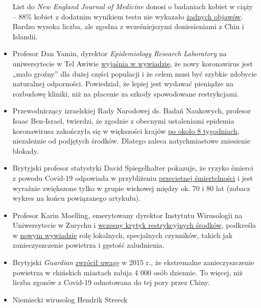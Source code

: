 \begin{itemize}
  List do \emph{New England Journal of Medicine} donosi o badaniach
  kobiet w ciąży -- 88\% kobiet z dodatnim wynikiem testu nie wykazało
  \href{https://www.nejm.org/doi/full/10.1056/NEJMc2009316}{żadnych
  objawów}. Bardzo wysoka liczba, ale zgodna z wcześniejszymi
  doniesieniami z Chin i Islandii.
\item
  Profesor Dan Yamin, dyrektor \emph{Epidemiology Research Laboratory}
  na uniwersytecie w Tel Awiwie
  \href{https://www.ynet.co.il/articles/0,7340,L-5714371,00.html}{wyjaśnia
  w wywiadzie}, że nowy koronawirus jest „mało groźny'' dla dużej części
  populacji i że celem musi być szybkie zdobycie naturalnej odporności.
  Powiedział, że lepiej jest wydawać pieniądze na rozbudowę kliniki, niż
  na płacenie za szkody spowodowane restrykcjami.
\item
  Przewodniczący izraelskiej Rady Narodowej ds. Badań Naukowych,
  profesor Isaac Ben-Israel, twierdzi, że zgodnie z obecnymi ustaleniami
  epidemia koronawirusa zakończyła się w większości krajów
  \href{https://www.timesofisrael.com/top-israeli-prof-claims-simple-stats-show-virus-plays-itself-out-after-70-days/}{po
  około 8 tygodniach}, niezależnie od podjętych środków. Dlatego zaleca
  natychmiastowe zniesienie blokady.
\item
  Brytyjski profesor statystyki David Spiegelhalter pokazuje, że ryzyko
  śmierci z powodu Covid-19 odpowiada w przybliżeniu
  \href{https://medium.com/wintoncentre/how-much-normal-risk-does-covid-represent-4539118e1196}{przecietnej
  śmiertelności} i jest wyraźnie zwiększone tylko w grupie wiekowej
  między ok. 70 i 80 lat (zobacz wykres na końcu powiązanego artykułu).
\item
  Profesor Karin Moelling, emerytowany dyrektor Instytutu Wirusologii na
  Uniwersytecie w Zurychu i
  \href{https://www.rubikon.news/artikel/die-stimme-der-vernunft}{wczesny
  krytyk restrykcyjnych środków}, podkreśla w
  \href{https://www.youtube.com/watch?v=4rl2sqLcDoQ}{nowym wywiadzie}
  rolę lokalnych, specjalnych czynników, takich jak zanieczyszczenie
  powietrza i gęstość zaludnienia.
\item
  Brytyjski \emph{Guardian}
  \href{https://www.theguardian.com/world/2015/aug/14/air-pollution-in-china-is-killing-4000-people-every-day-a-new-study-finds}{zwrócił
  uwagę} w 2015 r., że ekstremalne zanieczyszczenie powietrza w
  chińskich miastach zabija 4 000 osób dziennie. To więcej, niż liczba
  zgonów z Covid-19 odnotowana do tej pory przez Chiny.
\item
  Niemiecki wirusolog Hendrik Streeck

\end{itemize}
